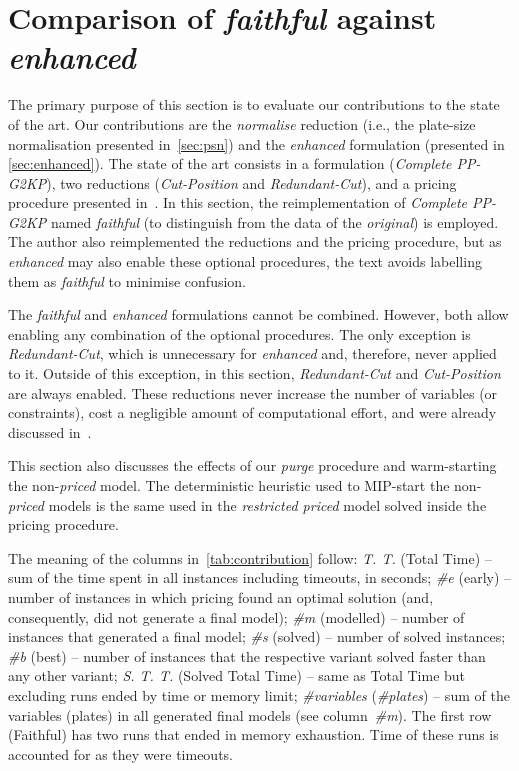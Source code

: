 \documentclass[ppgc,tese,english,formais,babel]{iiufrgs}
\begin{document}
\section{Comparison of \emph{faithful} against \emph{enhanced}}
\label{sec:comparison}

The primary purpose of this section is to evaluate our contributions to the state of the art.
Our contributions are the \emph{normalise} reduction (i.e., the plate-size normalisation presented in~\cref{sec:psn}) and the \emph{enhanced} formulation (presented in \cref{sec:enhanced}).
The state of the art consists in a formulation (\emph{Complete PP-G2KP}), two reductions (\emph{Cut-Position} and \emph{Redundant-Cut}), and a pricing procedure presented in~\citet{furini:2016,dimitri_thesis}.
In this section, the reimplementation of \emph{Complete PP-G2KP} named \emph{faithful} (to distinguish from the data of the \emph{original}) is employed.
The author also reimplemented the reductions and the pricing procedure, but as \emph{enhanced} may also enable these optional procedures, the text avoids labelling them as \emph{faithful} to minimise confusion.

The \emph{faithful} and \emph{enhanced} formulations cannot be combined.
However, both allow enabling any combination of the optional procedures.
The only exception is \emph{Redundant-Cut}, which is unnecessary for \emph{enhanced} and, therefore, never applied to it.
Outside of this exception, in this section, \emph{Redundant-Cut} and \emph{Cut-Position} are always enabled.
These reductions never increase the number of variables (or constraints), cost a negligible amount of computational effort, and were already discussed in~\citet{furini:2016,dimitri_thesis}.

This section also discusses the effects of our \emph{purge} procedure and warm-starting the non-\emph{priced} model.
The deterministic heuristic used to MIP-start the non-\emph{priced} models is the same used in the \emph{restricted priced} model solved inside the pricing procedure.

The meaning of the columns in~\cref{tab:contribution} follow:
\emph{T. T.} (Total Time) -- sum of the time spent in all instances including timeouts, in seconds;
\emph{\#e} (early) -- number of instances in which pricing found an optimal solution (and, consequently, did not generate a final model);
\emph{\#m} (modelled) -- number of instances that generated a final model;
\emph{\#s} (solved) -- number of solved instances;
\emph{\#b} (best) -- number of instances that the respective variant solved faster than any other variant;
\emph{S. T. T.} (Solved Total Time) -- same as Total Time but excluding runs ended by time or memory limit;
\emph{\#variables} (\emph{\#plates}) -- sum of the variables (plates) in all generated final models (see column~\emph{\#m}).
The first row (Faithful) has two runs that ended in memory exhaustion.
Time of these runs is accounted for as they were timeouts.
\end{document}
